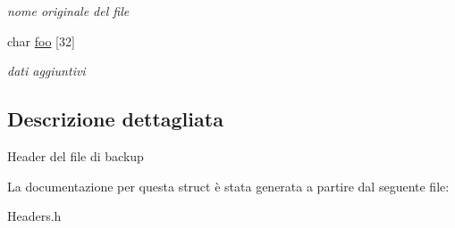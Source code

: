 \begin{DoxyCompactItemize}
\begin{DoxyCompactList}\small\item\em nome originale del file \end{DoxyCompactList}\item 
char \hyperlink{structfile__h_aee04c560748989339f3a6fb430169428}{foo} \mbox{[}32\mbox{]}\hypertarget{structfile__h_aee04c560748989339f3a6fb430169428}{}\label{structfile__h_aee04c560748989339f3a6fb430169428}

\begin{DoxyCompactList}\small\item\em dati aggiuntivi \end{DoxyCompactList}\end{DoxyCompactItemize}


\subsection{Descrizione dettagliata}
Header del file di backup 

La documentazione per questa struct è stata generata a partire dal seguente file\+:\begin{DoxyCompactItemize}
\item 
Headers.\+h\end{DoxyCompactItemize}
